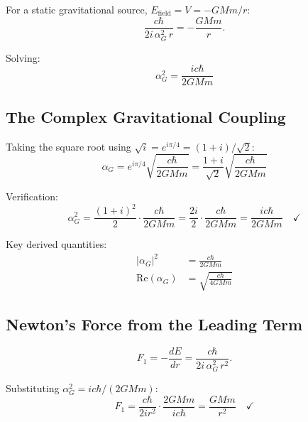 \documentclass[11pt,a4paper]{article}
\theoremstyle{definition}
\theoremstyle{remark}
\begin{document}
	For a static gravitational source, $E_{\mathrm{field}} = V = -GMm/r$:
	\begin{equation}
		\frac{c\hbar}{2i\,\alpha_G^2\,r} = -\frac{GMm}{r}.
	\end{equation}
	
	Solving:
	\begin{equation}
		\boxed{\alpha_G^2 = \frac{ic\hbar}{2GMm}}
		\label{eq:alphaG2}
	\end{equation}
	
	\subsection{The Complex Gravitational Coupling}
	
	Taking the square root using $\sqrt{i}=e^{i\pi/4}=(1+i)/\sqrt{2}$:
	\begin{equation}
		\boxed{\alpha_G = e^{i\pi/4}\sqrt{\frac{c\hbar}{2GMm}} = \frac{1+i}{\sqrt{2}}\sqrt{\frac{c\hbar}{2GMm}}}
		\label{eq:alphaG_full}
	\end{equation}
	
	Verification:
	\begin{equation}
		\alpha_G^2 = \frac{(1+i)^2}{2}\cdot\frac{c\hbar}{2GMm} = \frac{2i}{2}\cdot\frac{c\hbar}{2GMm} = \frac{ic\hbar}{2GMm} \quad\checkmark
	\end{equation}
	
	Key derived quantities:
	\begin{align}
		|\alpha_G|^2       &= \frac{c\hbar}{2GMm}                             \label{eq:mod_alphaG} \\
		\mathrm{Re}(\alpha_G) &= \sqrt{\frac{c\hbar}{4GMm}}                  \label{eq:re_alphaG}
	\end{align}
	
	\subsection{Newton's Force from the Leading Term}
	\label{subsec:newton_force}
	
	\begin{equation}
		F_1 = -\frac{dE}{dr} = \frac{c\hbar}{2i\,\alpha_G^2\,r^2}.
	\end{equation}
	
	Substituting $\alpha_G^2 = ic\hbar/(2GMm)$:
	\begin{equation}
		F_1 = \frac{c\hbar}{2ir^2}\cdot\frac{2GMm}{ic\hbar} = \frac{GMm}{r^2} \quad\checkmark
	\end{equation}
	
\end{document}
